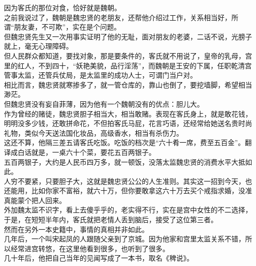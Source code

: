\begin{multicols}{\theparacolNo}
因为客氏的那位对食，恰好就是魏朝。\\

之前我说过了，魏朝是魏忠贤的老朋友，还帮他介绍过工作，关系相当好，所谓“朋友妻，不可欺”，实在是个问题。\\

但魏忠贤先生又一次用事实证明了他的无耻，面对朋友的老婆，二话不说，光膀子就上，毫无心理障碍。\\

但人民群众都知道，要找对象，那是要条件的，客氏就不用说了，皇帝的乳母，宫里的红人，不到四十，“妖艳美貌，品行淫荡”，而魏朝是王安的下属，任职乾清宫管事太监，还管兵仗局，是太监里的成功人士，可谓门当户对。\\

相比而言，魏忠贤就寒掺多了，就一管仓库的，靠山也倒了，要挖墙脚，希望相当渺茫。\\

但魏忠贤没有妄自菲薄，因为他有一个魏朝没有的优点：胆儿大。\\

作为曾经的赌徒，魏忠贤胆子相当大，相当敢赌。表现在客氏身上，就是敢花钱，明明没多少钱，还敢拼命花，不但拍客氏马屁，花言巧语，还经常给她送名贵时尚礼物，类似今天送法国化妆品，高级香水，相当有杀伤力。\\

这还不算，他隔三差五请客氏吃饭。吃饭的档次是“六十肴一席，费至五百金”。翻译成白话就是，一桌六十个菜，要花五百两银子。\\

五百两银子，大约是人民币四万多，就一顿饭，没落太监魏忠贤的消费水平大抵如此。\\

人穷不要紧，只要胆子大，这就是魏忠贤公公的人生准则。其实这一招到今天，也还能用，比如你家不富裕，就六十万，但你要敢拿这六十万去买个戒指求婚，没准真能蒙个把人回来。\\

外加魏太监不识字，看上去傻乎乎的，老实得不行，实在是宫中女性的不二选择，于是，在短短半年内，客氏就把老情人丢到脑后，接受了这位第三者。\\

然而在另外一本史籍中，事情的真相并非如此。\\

几年后，一个叫宋起凤的人跟随父亲到了京城。因为他家和宫里太监关系不错，所以经常进宫转悠，在这里他看到很多，也听到了很多。\\

几十年后，他把自己当年的见闻写成了一本书，取名《稗说》。\\


\end{multicols}
